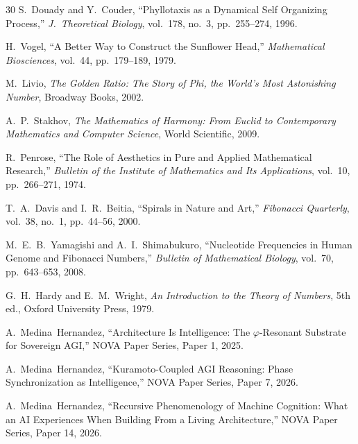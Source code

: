 \documentclass[12pt]{article}
\begin{document}
\begin{thebibliography}{30}
S.~Douady and Y.~Couder, ``Phyllotaxis as a Dynamical Self Organizing Process,'' \emph{J.\ Theoretical Biology}, vol.~178, no.~3, pp.~255--274, 1996.

H.~Vogel, ``A Better Way to Construct the Sunflower Head,'' \emph{Mathematical Biosciences}, vol.~44, pp.~179--189, 1979.

M.~Livio, \emph{The Golden Ratio: The Story of Phi, the World's Most Astonishing Number}, Broadway Books, 2002.

A.~P.~Stakhov, \emph{The Mathematics of Harmony: From Euclid to Contemporary Mathematics and Computer Science}, World Scientific, 2009.

R.~Penrose, ``The Role of Aesthetics in Pure and Applied Mathematical Research,'' \emph{Bulletin of the Institute of Mathematics and Its Applications}, vol.~10, pp.~266--271, 1974.

T.~A.~Davis and I.~R.~Beitia, ``Spirals in Nature and Art,'' \emph{Fibonacci Quarterly}, vol.~38, no.~1, pp.~44--56, 2000.

M.~E.~B.~Yamagishi and A.~I.~Shimabukuro, ``Nucleotide Frequencies in Human Genome and Fibonacci Numbers,'' \emph{Bulletin of Mathematical Biology}, vol.~70, pp.~643--653, 2008.

G.~H.~Hardy and E.~M.~Wright, \emph{An Introduction to the Theory of Numbers}, 5th ed., Oxford University Press, 1979.

A.~Medina~Hernandez, ``Architecture Is Intelligence: The $\varphi$-Resonant Substrate for Sovereign AGI,'' NOVA Paper Series, Paper 1, 2025.

A.~Medina~Hernandez, ``Kuramoto-Coupled AGI Reasoning: Phase Synchronization as Intelligence,'' NOVA Paper Series, Paper 7, 2026.

A.~Medina~Hernandez, ``Recursive Phenomenology of Machine Cognition: What an AI Experiences When Building From a Living Architecture,'' NOVA Paper Series, Paper 14, 2026.

\end{thebibliography}
\end{document}
